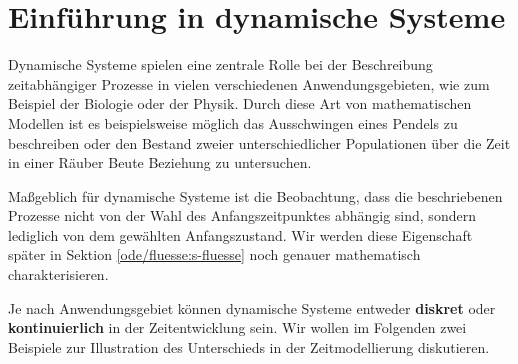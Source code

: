 \documentclass[letterpaper,10pt,english]{jupyterBook}
\begin{document}
\section{Einführung in dynamische Systeme}
\label{\detokenize{ode/dynamicSystems:einfuhrung-in-dynamische-systeme}}\label{\detokenize{ode/dynamicSystems::doc}}
\par
Dynamische Systeme spielen eine zentrale Rolle bei der Beschreibung zeitabhängiger Prozesse in vielen verschiedenen Anwendungsgebieten, wie zum Beispiel der Biologie oder der Physik.
Durch diese Art von mathematischen Modellen ist es beispielsweise möglich das Ausschwingen eines Pendels zu beschreiben oder den Bestand zweier unterschiedlicher Populationen über die Zeit in einer Räuber Beute Beziehung zu untersuchen.

\par
Maßgeblich für dynamische Systeme ist die Beobachtung, dass die beschriebenen Prozesse nicht von der Wahl des Anfangszeitpunktes abhängig sind, sondern lediglich von dem gewählten Anfangszustand.
Wir werden diese Eigenschaft später in Sektion \cref{ode/fluesse:s-fluesse}  noch genauer mathematisch charakterisieren.

\par
Je nach Anwendungsgebiet können dynamische Systeme entweder \textbf{diskret} oder \textbf{kontinuierlich} in der Zeitentwicklung sein.
Wir wollen im Folgenden zwei Beispiele zur Illustration des Unterschieds in der Zeitmodellierung diskutieren.
\end{document}
